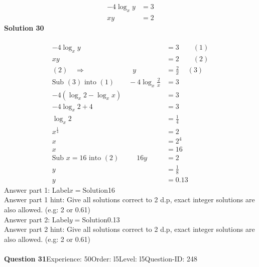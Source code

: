 \documentclass{article}
\begin{document}
\begin{align*}
-4\log_{x}y&=3\\[2pt]
xy&=2
\end{align*}
\noindent\textbf{Solution 30}\\[2pt]
\\[-35pt]\begin{align*}
-4\log_{x}y&=3\qquad (1)\\[2pt]
xy&=2\qquad (2)\\[2pt]
(2) \quad\Rightarrow\hspace{80pt} y&=\displaystyle\frac{2}{x}\hspace{14pt} (3)\\[2pt]
\text{Sub}\,\,(3)\,\,\text{into}\,\,(1)\qquad -4\log_{x}\displaystyle\frac{2}{x}&=3\\[2pt]
-4(\log_{x}2-\log_{x}x)&=3\\[2pt]
-4\log_{x}2+4&=3\\[2pt]
\log_{x}2&=\displaystyle\frac{1}{4}\\[2pt]
x^{\frac{1}{4}}&=2\\[2pt]
x&=2^4\\[2pt]
x&=16\\[12pt]
\text{Sub}\,\,x=16\,\,\text{into}\,\,(2)\hspace{30pt}16y&=2\\[2pt]
y&=\displaystyle\frac{1}{8}\\[2pt]
y&=0.13
\end{align*}
Answer part 1: \hspace{10pt}Label\hspace{10pt}$x=$\hspace{10pt}Solution\hspace{10pt}16\\
Answer part 1 hint: \hspace{15pt}Give all solutions correct to 2 d.p, exact integer solutions are also allowed. (e.g: 2 or 0.61)\\
Answer part 2: \hspace{10pt}Label\hspace{10pt}$y=$\hspace{10pt}Solution\hspace{10pt}0.13\\
Answer part 2 hint: \hspace{15pt}Give all solutions correct to 2 d.p, exact integer solutions are also allowed. (e.g: 2 or 0.61)\\
\\[4pt]
\noindent\textbf{Question 31}\hspace{20pt}Experience: 50\hspace{20pt}Order: l5\hspace{20pt}Level: l5\hspace{20pt}Question-ID: 248\\[2pt]
\end{document}
